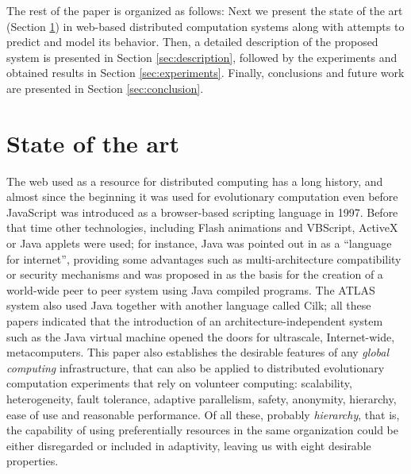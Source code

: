 \documentclass[journal,onecolumn]{IEEEtran}
\begin{document}
The rest of the paper is organized as follows: Next we present the
state of the art (Section \ref{sec:soa}) in web-based distributed 
computation systems along with attempts to predict and model its behavior. 
Then, a detailed description of the proposed system is presented 
in Section \ref{sec:description}, followed by the experiments and 
obtained results in Section \ref{sec:experiments}.
Finally, conclusions and future work are presented in Section \ref{sec:conclusion}. 


\section{State of the art}
\label{sec:soa}

The web used as a resource for distributed computing has a
long history, and almost since the beginning it was used for 
evolutionary computation even before JavaScript was
introduced as a browser-based scripting language in 1997. Before that
time other technologies,
 including Flash animations and VBScript, ActiveX or Java applets were
used; for instance, Java was pointed out in \cite{soares1998get} as a ``language for
internet'', providing some advantages such as multi-architecture compatibility or 
security mechanisms and was proposed in \cite{chandy1996world} as the
basis for the creation of a world-wide peer to peer system using Java
compiled programs. The ATLAS system
\cite{Baldeschwieler:1996:TIG:504450.504482} also used Java together
with another language called Cilk; all these papers indicated that
the introduction of an architecture-independent system such as the
Java virtual machine opened the doors for ultrascale, Internet-wide,
metacomputers. This paper also establishes the desirable features of
any {\em global computing} infrastructure, that can also be applied to
distributed evolutionary computation experiments that rely on
volunteer computing: scalability, heterogeneity, fault tolerance,
adaptive parallelism, safety, anonymity, hierarchy, ease of use and
reasonable performance. Of all these, probably {\em hierarchy}, that
is, the capability of using preferentially resources in the same
organization could be either disregarded or included in adaptivity,
leaving us with eight desirable properties. 
\end{document}
